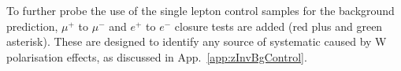 To further probe the use of the single lepton control samples for the
\znunu background prediction, $\mu^+$ to $\mu^-$ and $e^+$ to $e^-$
closure tests are added (red plus and green asterisk). These are 
designed to identify any source of systematic caused by W polarisation 
effects, as discussed in App.~\ref{app:zInvBgControl}.

\begin{figure}[h!]
  \begin{center}
     \\
     ~~
     \\
     ~~

\end{center}
\end{figure}
